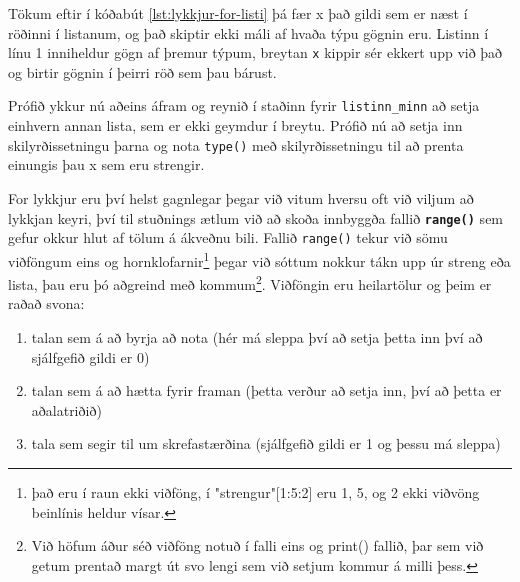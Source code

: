 \lstset{style=venjulegt}

Tökum eftir í kóðabút \ref{lst:lykkjur-for-listi} þá fær x það gildi sem er næst í röðinni í listanum, og það skiptir ekki máli af hvaða týpu gögnin eru.
Listinn í línu 1 inniheldur gögn af þremur týpum, breytan \texttt{x} kippir sér ekkert upp við það og birtir gögnin í þeirri röð sem þau bárust.

Prófið ykkur nú aðeins áfram og reynið í staðinn fyrir \texttt{listinn\_minn} að setja einhvern annan lista, sem er ekki geymdur í breytu.
Prófið nú að setja inn skilyrðissetningu þarna og nota \texttt{type()} með skilyrðissetningu til að prenta einungis þau x sem eru strengir.

For lykkjur eru því helst gagnlegar þegar við vitum hversu oft við viljum að lykkjan keyri, því til stuðnings ætlum við að skoða innbyggða fallið \textbf{\texttt{range()}} sem gefur okkur hlut af tölum á ákveðnu bili.
Fallið \texttt{range()} tekur við sömu viðföngum eins og hornklofarnir\footnote{það eru í raun ekki viðföng, í "strengur"[1:5:2] eru 1, 5, og 2 ekki viðvöng beinlínis heldur vísar.} þegar við sóttum nokkur tákn upp úr streng eða lista, þau eru þó aðgreind með kommum\footnote{Við höfum áður séð viðföng notuð í falli eins og print() fallið, þar sem við getum prentað margt út svo lengi sem við setjum kommur á milli þess.}.
Viðföngin eru heilartölur og þeim er raðað svona:

\begin{enumerate}
	\item talan sem á að byrja að nota (hér má sleppa því að setja þetta inn því að sjálfgefið gildi er 0)
	\item talan sem á að hætta fyrir framan (þetta verður að setja inn, því að þetta er aðalatriðið)
	\item tala sem segir til um skrefastærðina (sjálfgefið gildi er 1 og þessu má sleppa)
\end{enumerate}

